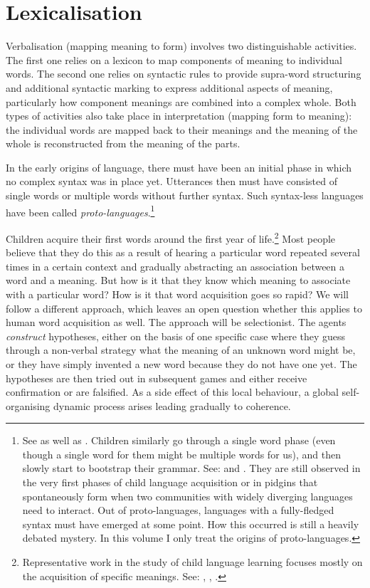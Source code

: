 \section{Lexicalisation}

Verbalisation (mapping meaning to form) 
involves two distinguishable activities.  The first one
relies on a lexicon to map components of meaning to
individual words. The second 
one relies on syntactic rules to provide supra-word structuring 
and additional syntactic marking to express additional
aspects of meaning, particularly how component meanings
are combined into a complex whole. Both types of 
activities also take place in interpretation (mapping form to meaning):
the individual words are mapped back to their meanings
and the meaning of the whole is reconstructed from the 
meaning of the parts. 

In the early origins of language,
there must have been an initial phase in which no complex syntax 
was in place yet. Utterances then must have consisted of single words
or multiple words without further syntax. 
Such syntax-less languages have been called {\itshape proto-languages}.\footnote{
See \cite{Bickerton:1990} as well as \cite{Thomason:1988}. Children similarly 
go through a single word phase (even though a single 
word for them might be multiple words for us), and 
then slowly start to bootstrap their grammar. 
See: \cite{Tomasello:1991} and \cite{Bates:1991}. 
They are still observed in the very first phases of 
child language acquisition or in pidgins that spontaneously 
form when two communities with widely diverging languages
need to interact. Out of proto-languages, languages 
with a fully-fledged syntax must have emerged at some point. 
How this occurred is still a heavily debated mystery. In this volume 
I only treat the origins of proto-languages.} 

Children acquire their first words around the first year
of life.\footnote{
Representative work in the study of child language
learning focuses mostly on the acquisition of specific meanings.
See: \cite{Gleitman:1994}, 
\cite{Clark:1993}, \cite{Bowerman:1996}.}
Most people believe that they do this 
as a result of hearing a particular word repeated several times in a
certain context and gradually abstracting an
association between a word and a meaning. But 
how is it that they know which meaning to associate with a 
particular word? How is it that word acquisition goes
so rapid? We will follow a different 
approach, which leaves an open question whether
this applies to human word acquisition as well. The
approach will be selectionist. The agents {\itshape construct} 
hypotheses, either on the basis of one specific case 
where they guess through a non-verbal strategy what 
the meaning of an unknown word might be, 
or they have simply invented a new word because
they do not have one yet. The hypotheses are 
then tried out in subsequent games and either receive confirmation
or are falsified. As a side effect of this local behaviour, 
a global self-organising dynamic process arises leading gradually to coherence. 

